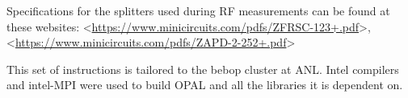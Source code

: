 \documentclass[table]{iitthesis}
\newcommand{\nrnote}[1]{\textsf{{\color{blue}{ NN note:}   #1 }}}
\begin{document}
Specifications for the splitters used during RF measurements can be found at these websites:
<\url{https://www.minicircuits.com/pdfs/ZFRSC-123+.pdf}>, \\
<\url{https://www.minicircuits.com/pdfs/ZAPD-2-252+.pdf}>



 \label{build}
This set of instructions is tailored to the bebop cluster at ANL. 
Intel compilers and intel-MPI were used to build OPAL and all 
the libraries it is dependent on.
\end{document}
